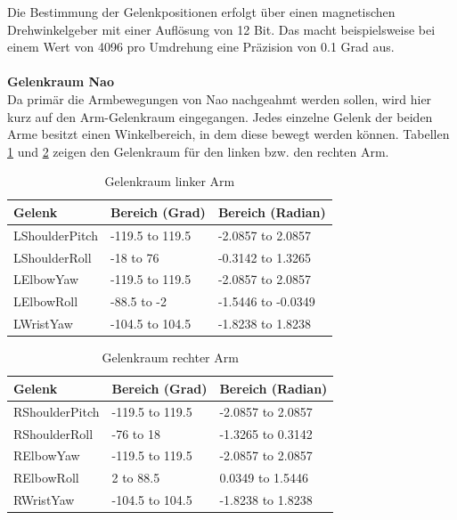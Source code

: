 Die Bestimmung der Gelenkpositionen erfolgt über einen magnetischen Drehwinkelgeber	mit einer Auflösung von 12 Bit. Das macht beispielsweise bei einem Wert von 4096 pro Umdrehung eine Präzision von 0.1 Grad aus.
\\
\\
\textbf{Gelenkraum Nao}
\\
Da primär die Armbewegungen von Nao nachgeahmt werden sollen, wird hier kurz auf den Arm-Gelenkraum eingegangen. Jedes einzelne Gelenk der beiden Arme besitzt einen Winkelbereich, in dem diese bewegt werden können. Tabellen \ref{tab:Lgelenkraum} und \ref{tab:Rgelenkraum} zeigen den Gelenkraum für den linken bzw. den rechten Arm.
\\

\begin{table}[H]
 \centering 
    \begin{tabular}{|l|l|l|}
    \hline
    \textbf{Gelenk}         & \textbf{Bereich (Grad) } & \textbf{Bereich (Radian)}   \\
    \hline
    LShoulderPitch & -119.5 to 119.5 & -2.0857 to 2.0857  \\
    LShoulderRoll  & -18 to 76       & -0.3142 to 1.3265  \\
    LElbowYaw      & -119.5 to 119.5 & -2.0857 to 2.0857  \\
    LElbowRoll     & -88.5 to -2     & -1.5446 to -0.0349 \\
    LWristYaw      & -104.5 to 104.5 & -1.8238 to 1.8238  \\ \hline
    \end{tabular}
    \caption {Gelenkraum linker Arm}
    \label{tab:Lgelenkraum}
\end{table}
\begin{table}[H]
 \centering 
    \begin{tabular}{|l|l|l|}
    \hline
    \textbf{Gelenk}         & \textbf{Bereich (Grad) } & \textbf{Bereich (Radian)}   \\
    \hline
    RShoulderPitch & -119.5 to 119.5 & -2.0857 to 2.0857 \\
    RShoulderRoll  & -76 to 18       & -1.3265 to 0.3142 \\
    RElbowYaw      & -119.5 to 119.5 & -2.0857 to 2.0857 \\
    RElbowRoll     & 2 to 88.5       & 0.0349 to 1.5446  \\
    RWristYaw      & -104.5 to 104.5 & -1.8238 to 1.8238 \\ \hline
    \end{tabular}
    \caption {Gelenkraum rechter Arm}
    \label{tab:Rgelenkraum}
\end{table}
